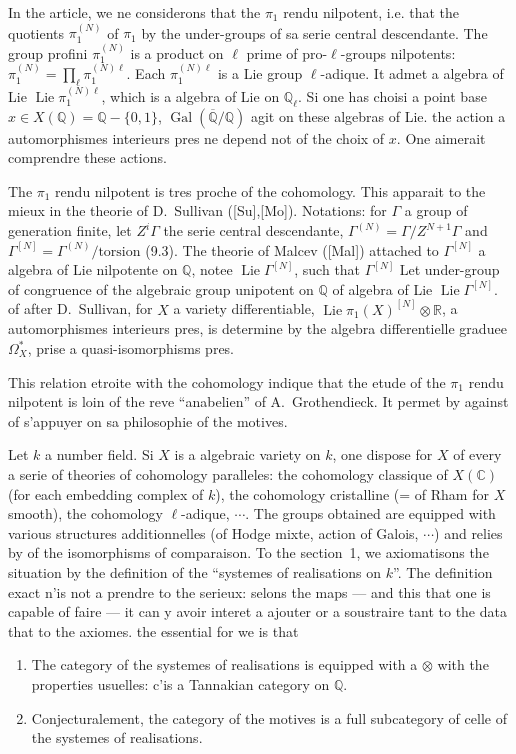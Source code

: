 \documentclass[12pt,a4paper]{article}
\theoremstyle{plain}
\theoremstyle{definition}
\theoremstyle{remark}
\DeclareMathOperator{\Gal}{Gal}
\DeclareMathOperator{\Lie}{Lie}
\providecommand{\Gal}{\operatorname{Gal}}
\providecommand{\Lie}{\operatorname{Lie}}
\begin{document}
In the article, we ne considerons that the $\pi_1$ rendu nilpotent, i.e. that the
quotients $\pi_1^{(N)}$ of $\pi_1$ by the under-groups of sa serie central descendante.
The group profini $\pi_1^{(N)}$ is a product on $\ell$ prime of pro-$\ell$-groups
nilpotents: $\pi_1^{(N)} = \prod_\ell \pi_1^{(N)\ell}$. Each $\pi_1^{(N)\ell}$ is a
Lie group $\ell$-adique. It admet a algebra of Lie $\Lie\pi_1^{(N)\ell}$, which is
a algebra of Lie on $\mathbb{Q}_\ell$. Si one has choisi a point base
$x \in X(\mathbb{Q}) = \mathbb{Q} - \{0, 1\}$, $\Gal(\overline{\mathbb{Q}}/\mathbb{Q})$ agit on these algebras of
Lie. the action a automorphismes interieurs pres ne depend not of the choix of $x$.
One aimerait comprendre these actions.

The $\pi_1$ rendu nilpotent is tres proche of the cohomology. This apparait to the
mieux in the theorie of D.~Sullivan ([Su],[Mo]). Notations: for $\Gamma$ a group
of generation finite, let $Z^i\Gamma$ the serie central descendante,
$\Gamma^{(N)} = \Gamma/Z^{N+1}\Gamma$ and $\Gamma^{[N]} = \Gamma^{(N)}/\text{torsion}$ (9.3).
The theorie of Malcev ([Mal]) attached to $\Gamma^{[N]}$ a algebra of Lie nilpotente
on $\mathbb{Q}$, notee $\Lie\Gamma^{[N]}$, such that $\Gamma^{[N]}$ Let under-group of
congruence of the algebraic group unipotent on $\mathbb{Q}$ of algebra of Lie
$\Lie\Gamma^{[N]}$. of after D.~Sullivan, for $X$ a variety differentiable,
$\Lie\pi_1(X)^{[N]} \otimes \mathbb{R}$, a automorphismes interieurs pres, is
determine by the algebra differentielle graduee $\Omega_X^*$, prise a
quasi-isomorphisms pres.

This relation etroite with the cohomology indique that the etude of the $\pi_1$ rendu
nilpotent is loin of the reve ``anabelien'' of A.~Grothendieck. It permet by against
of s'appuyer on sa philosophie of the motives.

Let $k$ a number field. Si $X$ is a algebraic variety on $k$, one dispose
for $X$ of every a serie of theories of cohomology paralleles: the cohomology
classique of $X(\mathbb{C})$ (for each embedding complex of $k$), the cohomology
cristalline (= of Rham for $X$ smooth), the cohomology $\ell$-adique, $\cdots$.
The groups obtained are equipped with various structures additionnelles (of Hodge mixte,
action of Galois, $\cdots$) and relies by of the isomorphisms of comparaison. To the section~1,
we axiomatisons the situation by the definition of the ``systemes of realisations on $k$''.
The definition exact n'is not a prendre to the serieux: selons the maps --- and this that one
is capable of faire --- it can y avoir interet a ajouter or a soustraire tant to the
data that to the axiomes. the essential for we is that
\begin{enumerate}[label=(\roman*)]
\item The category of the systemes of realisations is equipped with a $\otimes$ with the
properties usuelles: c'is a Tannakian category on $\mathbb{Q}$.
\item Conjecturalement, the category of the motives is a full subcategory of
celle of the systemes of realisations.
\end{enumerate}
\end{document}
